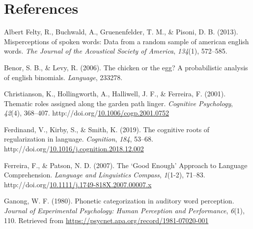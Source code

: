 \documentclass[10pt, letterpaper]{article}
\newenvironment{CSLReferences}%
  {}%
  {\par}
\begin{document}
\hypertarget{references}{%
\section{References}\label{references}}

\setlength{\parindent}{-0.1in} 
\setlength{\leftskip}{0.125in}

\noindent

\hypertarget{refs}{}
\begin{CSLReferences}{1}{0}
\leavevmode{}%
Albert Felty, R., Buchwald, A., Gruenenfelder, T. M., \& Pisoni, D. B.
(2013). Misperceptions of spoken words: Data from a random sample of
american english words. \emph{The Journal of the Acoustical Society of
America}, \emph{134}(1), 572--585.

\leavevmode{}%
Benor, S. B., \& Levy, R. (2006). The chicken or the egg? A
probabilistic analysis of english binomials. \emph{Language}, 233278.

\leavevmode{}%
Christianson, K., Hollingworth, A., Halliwell, J. F., \& Ferreira, F.
(2001). Thematic roles assigned along the garden path linger.
\emph{Cognitive Psychology}, \emph{42}(4), 368--407.
http://doi.org/\href{https://doi.org/10.1006/cogp.2001.0752}{10.1006/cogp.2001.0752}

\leavevmode{}%
Ferdinand, V., Kirby, S., \& Smith, K. (2019). The cognitive roots of
regularization in language. \emph{Cognition}, \emph{184}, 53--68.
http://doi.org/\href{https://doi.org/10.1016/j.cognition.2018.12.002}{10.1016/j.cognition.2018.12.002}

\leavevmode{}%
Ferreira, F., \& Patson, N. D. (2007). The {`}Good Enough{'} Approach to
Language Comprehension. \emph{Language and Linguistics Compass},
\emph{1}(1-2), 71--83.
http://doi.org/\href{https://doi.org/10.1111/j.1749-818X.2007.00007.x}{10.1111/j.1749-818X.2007.00007.x}

\leavevmode{}%
Ganong, W. F. (1980). Phonetic categorization in auditory word
perception. \emph{Journal of Experimental Psychology: Human Perception
and Performance}, \emph{6}(1), 110. Retrieved from
\url{https://psycnet.apa.org/record/1981-07020-001}


\end{CSLReferences}
\end{document}
